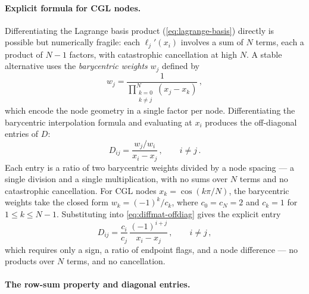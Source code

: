\paragraph{Explicit formula for CGL nodes.}

Differentiating the Lagrange basis product
(\cref{eq:lagrange-basis}) directly is possible but numerically
fragile: each $\ell_j'(x_i)$ involves a sum of $N$ terms, each a
product of $N - 1$ factors, with catastrophic cancellation at high
$N$.  A stable alternative uses the \emph{barycentric weights}
$w_j$ defined by
%
\begin{equation}
  w_j = \frac{1}{\prod_{\substack{k=0 \\ k \neq j}}^{N}
    (x_j - x_k)} \,,
  \label{eq:bary-weights}
\end{equation}
%
which encode the node geometry in a single factor per node.
Differentiating the barycentric interpolation formula and
evaluating at $x_i$ produces the off-diagonal entries of $D$:
%
\begin{equation}
  D_{ij} = \frac{w_j / w_i}{x_i - x_j} \,, \qquad i \neq j \,.
  \label{eq:diffmat-offdiag}
\end{equation}
%
Each entry is a ratio of two barycentric weights divided by a
node spacing --- a single division and a single multiplication,
with no sums over $N$ terms and no catastrophic cancellation.
For CGL nodes $x_k = \cos(k\pi/N)$, the barycentric weights take the
closed form $w_k = (-1)^k / c_k$, where $c_0 = c_N = 2$ and
$c_k = 1$ for $1 \leq k \leq N - 1$.  Substituting into
\cref{eq:diffmat-offdiag} gives the explicit entry
%
\begin{equation}
  D_{ij} = \frac{c_i}{c_j}\,
    \frac{(-1)^{i+j}}{x_i - x_j} \,, \qquad i \neq j \,,
  \label{eq:diffmat-cgl}
\end{equation}
%
which requires only a sign, a ratio of endpoint flags, and a node
difference --- no products over $N$ terms, and no cancellation.

\paragraph{The row-sum property and diagonal entries.}

